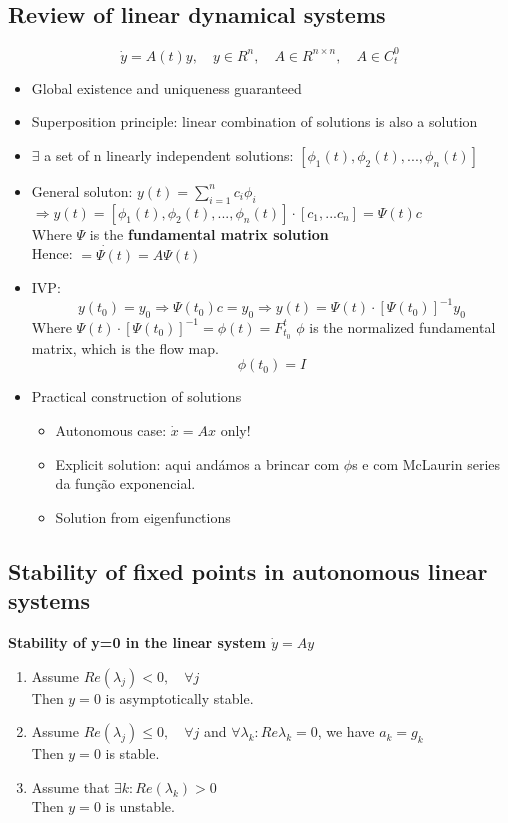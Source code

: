 \subsection{Review of linear dynamical systems}
$$\dot{y}=A(t)y, \quad y\in R^n, \quad A \in R^{n\times n}, \quad A\in C^0_t$$
\begin{itemize}
    \item Global existence and uniqueness guaranteed
    \item Superposition principle: linear combination of solutions is also a solution
    \item $\exists$ a set of n linearly independent solutions: $[\phi_1(t), \phi_2(t), ..., \phi_n(t)]$
    \item General soluton: $y(t)=\sum_{i=1}^n c_i\phi_i$ \\
    $\Rightarrow y(t)=[\phi_1(t), \phi_2(t), ..., \phi_n(t)]\cdot[c_1, ... c_n] = \Psi(t)c$ \\
    Where $\Psi$ is the \textbf{fundamental matrix solution}\\
    Hence: $\dot{= \Psi(t)}= A\Psi(t)$
    \item IVP: $$y(t_0)=y_0 \Rightarrow \Psi(t_0)c=y_0 \Rightarrow y(t)=\Psi(t)\cdot [\Psi(t_0)]^{-1}y_0$$
    Where $\Psi(t)\cdot [\Psi(t_0)]^{-1} = \phi(t)=F_{t_0}^t$
    $\phi$ is the normalized fundamental matrix, which is the flow map.
    $$\phi(t_0)=I$$
    \item Practical construction of solutions
        \begin{itemize}
            \item Autonomous case: $\dot{x}=Ax$ only!
            \item Explicit solution: aqui andámos a brincar com $\phi$s e com McLaurin series da função exponencial.
            \item Solution from eigenfunctions
        \end{itemize}
\end{itemize}

\subsection{Stability of fixed points in autonomous linear systems}
 \begin{theorem}
 \textbf{Stability of y=0 in the linear system $\dot{y}=Ay$}
    \begin{enumerate}
        \item Assume $Re(\lambda_j)<0, \quad \forall j$\\
        Then $y=0$ is asymptotically stable.
        \item Assume $Re(\lambda_j)\leq0, \quad \forall j$ and $\forall\lambda_k: Re\lambda_k=0$, we have $a_k=g_k$\\
        Then $y=0$ is stable.
        \item Assume that $\exists k: Re(\lambda_k)>0$\\
        Then $y=0$ is unstable.
    \end{enumerate}
 \end{theorem}
 
